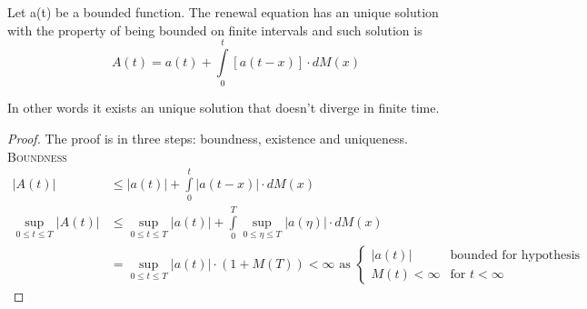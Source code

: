 \begin{theorem}[4.1 K.T. p.184]
	Let a(t) be a bounded function. The renewal equation has an unique solution with
	the property of being bounded on finite intervals and such solution is
	\begin{equation}
		A(t) = a(t) + \int\limits_0^{t}[a(t-x)] \cdot dM(x)
	\end{equation}
\end{theorem}
In other words it exists an unique solution that doesn't diverge in finite time.
\begin{proof}
	The proof is in three steps: boundness, existence and uniqueness.
	\proofpart
	\textsc{Boundness}\label{req:boundness}
	\begin{equation}\begin{split}
		|A(t)| & \le |a(t)| + \int\limits_0^{t}|a(t-x)| \cdot dM(x) \\
		\sup_{0\le t \le T} |A(t)| & \le \sup_{0\le t \le T} |a(t)| + \int\limits_0^{T}\sup_{0\le \eta \le T}|a(\eta)| \cdot dM(x) \\
		& = \sup_{0\le t \le T} |a(t)| \cdot (1+M(T)) < \infty \text{ as }
		\begin{cases}
			|a(t)| & \text{bounded for hypothesis} \\
			M(t) < \infty & \text{for } t<\infty
		\end{cases}
	\end{split}\end{equation}


\end{proof}
